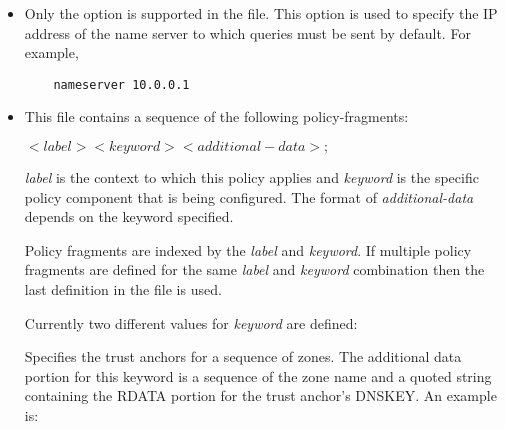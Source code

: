 \begin{itemize}
                                                                                                                             
\item  {}
                                                                                                                             
Only the  option is supported in the  file.
This option is used to specify the IP address of the name server to
which queries must be sent by default. For example,

\begin{verbatim}
    nameserver 10.0.0.1
\end{verbatim}
                                                                                                                             
\item {}
                                                                                                                             
This file contains a sequence of the following policy-fragments:
                                                                                                                             
{\it $<label> <keyword> <additional-data>;$}
                                                                                                                             
{\it label} is the context to which this policy applies and {\it keyword} is the
specific policy component that is being configured. The format of
{\it additional-data} depends on the keyword specified.
                                                                                                                             
Policy fragments are indexed by the {\it label} and {\it keyword}. If multiple
policy fragments are defined for the same {\it label} and {\it keyword}
combination then the last definition in the file is used.

Currently two different values for {\it keyword} are defined:


Specifies the trust anchors for a sequence of zones. The
additional data portion for this keyword is a sequence of the
zone name and a quoted string containing the RDATA portion for
the trust anchor's DNSKEY. An example is:


\end{itemize}
